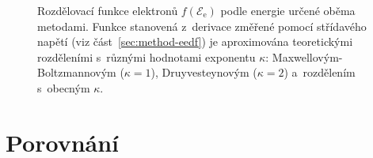 \documentclass{protokol}
\newcommand\enelec{\mathcal E_\mathrm{e}}
\newcommand\eedf{f(\enelec)}
\begin{document}
\begin{figure}[p]
	\centering
	
	\par\smallskip
	
	\par\smallskip
	
	\caption{Rozdělovací funkce elektronů $\eedf$ podle energie určené
		oběma metodami.
		Funkce stanovená z~derivace změřené pomocí střídavého napětí
		(viz část~\ref{sec:method-eedf})
		je aproximována teoretickými rozděleními s~různými hodnotami
		exponentu $\kappa$:
		Maxwellovým-Boltzmannovým ($\kappa = 1$),
		Druyvesteynovým ($\kappa = 2$)
		a~rozdělením s~obecným $\kappa$.}
	\label{fig:eedf}
\end{figure}

\section{Porovnání}
\end{document}

